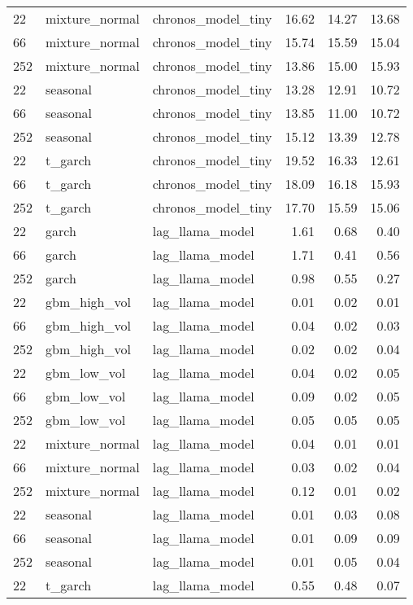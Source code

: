 {\begin{tabular}{lllrrr}
\midrule
22 & mixture\_normal & chronos\_model\_tiny & 16.62 & 14.27 & 13.68 \\
66 & mixture\_normal & chronos\_model\_tiny & 15.74 & 15.59 & 15.04 \\
252 & mixture\_normal & chronos\_model\_tiny & 13.86 & 15.00 & 15.93 \\
\midrule
22 & seasonal & chronos\_model\_tiny & 13.28 & 12.91 & 10.72 \\
66 & seasonal & chronos\_model\_tiny & 13.85 & 11.00 & 10.72 \\
252 & seasonal & chronos\_model\_tiny & 15.12 & 13.39 & 12.78 \\
\midrule
22 & t\_garch & chronos\_model\_tiny & 19.52 & 16.33 & 12.61 \\
66 & t\_garch & chronos\_model\_tiny & 18.09 & 16.18 & 15.93 \\
252 & t\_garch & chronos\_model\_tiny & 17.70 & 15.59 & 15.06 \\
\midrule
22 & garch & lag\_llama\_model & 1.61 & 0.68 & 0.40 \\
66 & garch & lag\_llama\_model & 1.71 & 0.41 & 0.56 \\
252 & garch & lag\_llama\_model & 0.98 & 0.55 & 0.27 \\
\midrule
22 & gbm\_high\_vol & lag\_llama\_model & 0.01 & 0.02 & 0.01 \\
66 & gbm\_high\_vol & lag\_llama\_model & 0.04 & 0.02 & 0.03 \\
252 & gbm\_high\_vol & lag\_llama\_model & 0.02 & 0.02 & 0.04 \\
\midrule
22 & gbm\_low\_vol & lag\_llama\_model & 0.04 & 0.02 & 0.05 \\
66 & gbm\_low\_vol & lag\_llama\_model & 0.09 & 0.02 & 0.05 \\
252 & gbm\_low\_vol & lag\_llama\_model & 0.05 & 0.05 & 0.05 \\
\midrule
22 & mixture\_normal & lag\_llama\_model & 0.04 & 0.01 & 0.01 \\
66 & mixture\_normal & lag\_llama\_model & 0.03 & 0.02 & 0.04 \\
252 & mixture\_normal & lag\_llama\_model & 0.12 & 0.01 & 0.02 \\
\midrule
22 & seasonal & lag\_llama\_model & 0.01 & 0.03 & 0.08 \\
66 & seasonal & lag\_llama\_model & 0.01 & 0.09 & 0.09 \\
252 & seasonal & lag\_llama\_model & 0.01 & 0.05 & 0.04 \\
\midrule
22 & t\_garch & lag\_llama\_model & 0.55 & 0.48 & 0.07 \\

\end{tabular}}

